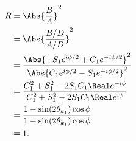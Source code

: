 \begin{enumerate}[(i)]
\begin{equation}
\begin{aligned}
R
&= \Abs{\frac{B}{A}}^2
\\ &= \Abs{\frac{B/D}{A/D}}^2
\\ &= \frac{\Abs{-S_1 e^{i \phi/2} + C_1 e^{-i \phi/2}}^2}
{\Abs{C_1 e^{i \phi/2} -S_1 e^{-i \phi/2} }^2}
\\ &=
\frac
{ C_1^2 + S_1^2 - 2 S_1 C_1 \Real e^{-i\phi} }
{ C_1^2 + S_1^2 - 2 S_1 C_1 \Real e^{i\phi} }
\\ &=
\frac
{ 1 - \sin( 2 \theta_{k_1}) \cos \phi }
{ 1 - \sin( 2 \theta_{k_1}) \cos \phi }
\\ &=
1.
\end{aligned}
\end{equation}
%
%
\end{enumerate}
